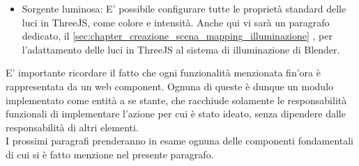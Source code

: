 \begin{itemize}
\begin{itemize}
\item Sorgente luminosa: E’ possibile configurare tutte le proprietà standard delle luci in ThreeJS, come colore e intensità. Anche qui vi sarà un paragrafo dedicato, il \ref{sec:chapter_creazione_scena_mapping_illuminazione} , per l’adattamento delle luci in ThreeJS al sistema di illuminazione di Blender.
\end{itemize}
\end{itemize}
E’ importante ricordare il fatto che ogni funzionalità menzionata fin’ora è rappresentata da un web component. Ognuna di queste è dunque un modulo implementato come entità a se stante, che racchiude solamente le responsabilità funzionali di implementare l’azione per cui è stato ideato, senza dipendere dalle responsabilità di altri elementi.
\\
I prossimi paragrafi prenderanno in esame ognuna delle componenti fondamentali di cui si è fatto menzione nel presente paragrafo.

